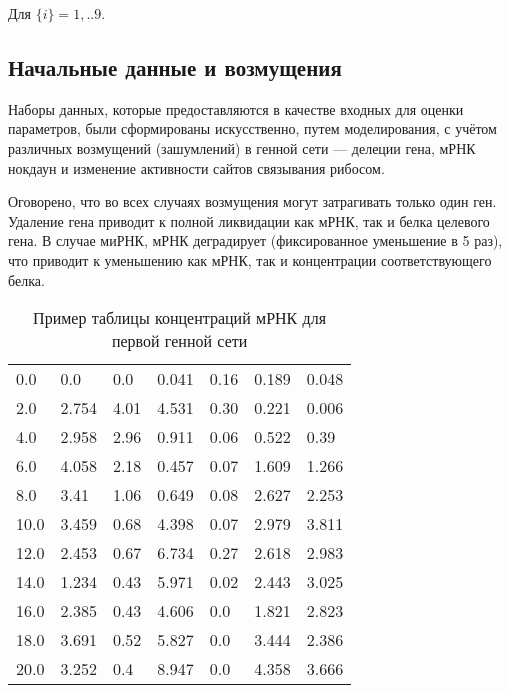 Для $\{i\} = 1,..9$.

\subsection{Начальные данные и возмущения} \label{s2_4}

Наборы данных, которые предоставляются в качестве входных для оценки параметров,
были сформированы искусственно, путем моделирования, с учётом различных 
возмущений (зашумлений) в генной сети — делеции гена, мРНК нокдаун и изменение 
активности сайтов связывания рибосом. 

Оговорено, что во всех случаях возмущения могут затрагивать только один ген. 
Удаление гена приводит к полной ликвидации как мРНК, так и белка целевого гена. 
В случае миРНК, мРНК деградирует (фиксированное уменьшение в 5 раз), что 
приводит к уменьшению как мРНК, так и концентрации соответствующего белка.

\begin{table}[h]
  \centering
    \begin{tabular}{l|llllll}
        0.0	  & 0.0    & 0.0   & 0.041  & 0.16  & 0.189  & 0.048 \\
        2.0	  & 2.754  & 4.01  & 4.531  & 0.30  & 0.221  & 0.006 \\
        4.0	  & 2.958  & 2.96  & 0.911  & 0.06  & 0.522  & 0.39  \\
        6.0	  & 4.058  & 2.18  & 0.457  & 0.07  & 1.609  & 1.266 \\
        8.0	  & 3.41   & 1.06  & 0.649  & 0.08  & 2.627  & 2.253 \\
        10.0  & 3.459  & 0.68  & 4.398  & 0.07  & 2.979  & 3.811 \\
        12.0  & 2.453  & 0.67  & 6.734  & 0.27  & 2.618  & 2.983 \\
        14.0  & 1.234  & 0.43  & 5.971  & 0.02  & 2.443  & 3.025 \\
        16.0  & 2.385  & 0.43  & 4.606  & 0.0   & 1.821  & 2.823 \\
        18.0  & 3.691  & 0.52  & 5.827  & 0.0   & 3.444  & 2.386 \\
        20.0  & 3.252  & 0.4   & 8.947  & 0.0   & 4.358  & 3.666 
    \end{tabular}
  \caption{Пример таблицы концентраций мРНК для первой генной сети}
  \label{mRNAtable}
\end{table}

\clearpage
